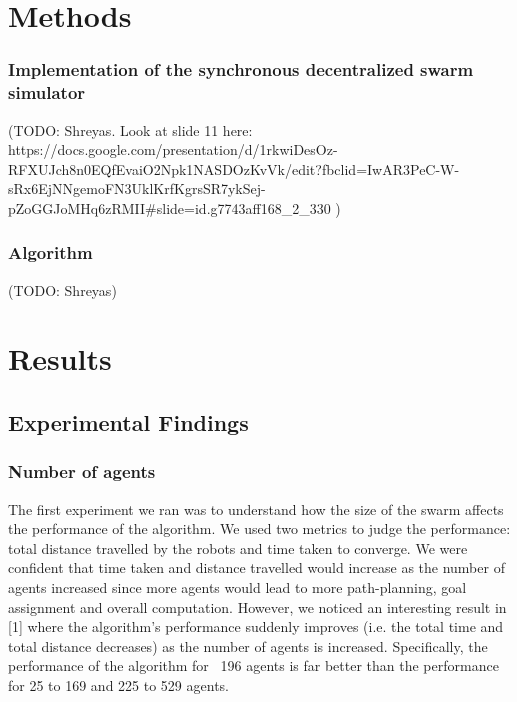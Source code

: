 \section{Methods}

\subsubsection{Implementation of the synchronous decentralized swarm simulator}

(TODO: Shreyas. Look at slide 11 here: https://docs.google.com/presentation/d/1rkwiDesOz-RFXUJch8n0EQfEvaiO2Npk1NASDOzKvVk/edit?fbclid=IwAR3PeC-W-sRx6EjNNgemoFN3UklKrfKgrsSR7ykSej-pZoGGJoMHq6zRMII#slide=id.g7743aff168_2_330 )

\subsubsection{Algorithm}
(TODO: Shreyas)

\section{Results}

\subsection{Experimental Findings}

\subsubsection{Number of agents}
The first experiment we ran was to understand how the size of the swarm affects the performance of the algorithm. We used two metrics to judge the performance: total distance travelled by the robots and time taken to converge. We were confident that time taken and distance travelled would increase as the number of agents increased since more agents would lead to more path-planning, goal assignment and overall computation. However, we noticed an interesting result in [1] where the algorithm's performance suddenly improves (i.e. the total time and total distance decreases) as the number of agents is increased. Specifically, the performance of the algorithm for ~196 agents is far better than the performance for 25 to 169 and 225 to 529 agents. 

